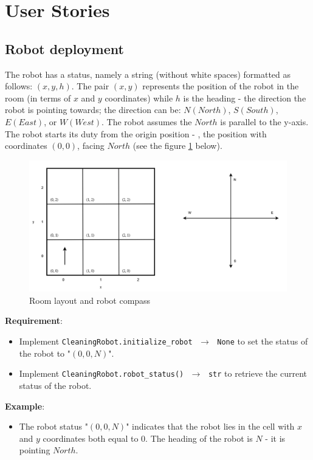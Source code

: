 \section{User Stories}
\subsection{Robot deployment}
The robot has a status, namely a string (without white spaces) formatted as follows: $(x,y,h)$. The pair $(x,y)$ represents the position of the robot in the room (in terms of $x$ and $y$ coordinates) while $h$ is the heading - \ie the direction the robot is pointing towards; the direction can be: $N (North)$, $S (South)$, $E (East)$, or $W (West)$. The robot assumes the $North$ is parallel to the y-axis. The robot starts its duty from the origin position - \ie, the position with coordinates $(0,0)$, facing $North$ (see the figure \ref{room_and_compass} below).

\begin{figure}[H]
    \centering
    \includegraphics[width=\linewidth]{figures/appendix/cleaning_robot_1.png}
    \caption{Room layout and robot compass}
    \label{room_and_compass}
\end{figure}

\noindent\textbf{Requirement}:
\begin{itemize}
    \item Implement \texttt{CleaningRobot.initialize\_robot $\,\to\,$ None} to set the status of the robot to "$(0,0,N)$".
    \item Implement \texttt{CleaningRobot.robot\_status()  $\,\to\,$ str} to retrieve the current status of the robot.
\end{itemize}

\noindent\textbf{Example}:
\begin{itemize}
    \item The robot status "$(0,0,N)$" indicates that the robot lies in the cell with $x$ and $y$ coordinates both equal to 0. The heading of the robot is $N$ - \ie it is pointing $North$.
\end{itemize}


